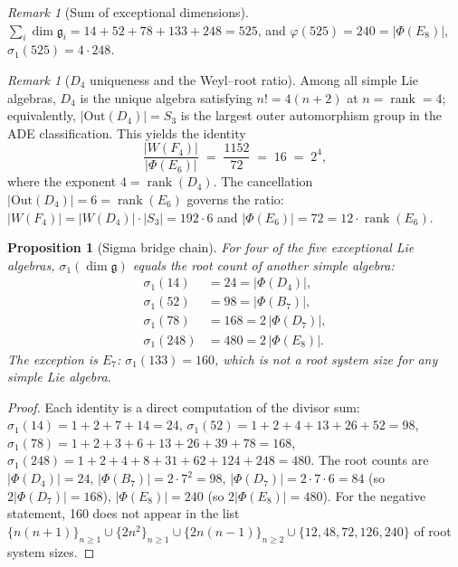 \documentclass[11pt]{amsart}
\theoremstyle{plain}
\newtheorem{proposition}[theorem]{Proposition}
\theoremstyle{definition}
\theoremstyle{remark}
\newtheorem{remark}[theorem]{Remark}
\newcommand{\fg}{\mathfrak{g}}
\renewcommand{\Phi}{\varPhi}
\newcommand{\rank}{\operatorname{rank}}
\begin{document}
\begin{remark}[Sum of exceptional dimensions]\label{rem:sum-dims}
$\sum_{i} \dim \mathfrak{g}_i = 14+52+78+133+248 = 525$, and
$\varphi(525) = 240 = |\Phi(E_8)|$, $\sigma_1(525) = 4 \cdot 248$.
\end{remark}

\begin{remark}[$D_4$ uniqueness and the Weyl--root ratio]%
\label{rem:weyl-root-ratio}
Among all simple Lie algebras, $D_4$ is the unique algebra satisfying
$n! = 4(n+2)$ at $n = \rank = 4$; equivalently,
$|\mathrm{Out}(D_4)| = S_3$ is the largest outer automorphism group
in the ADE classification.  This yields the identity
\[
  \frac{|W(F_4)|}{|\Phi(E_6)|}
  \;=\; \frac{1152}{72} \;=\; 16 \;=\; 2^4,
\]
where the exponent $4 = \rank(D_4)$.  The cancellation
$|\mathrm{Out}(D_4)| = 6 = \rank(E_6)$ governs the ratio:
$|W(F_4)| = |W(D_4)| \cdot |S_3| = 192 \cdot 6$ and
$|\Phi(E_6)| = 72 = 12 \cdot \rank(E_6)$.
\end{remark}

\begin{proposition}[Sigma bridge chain]\label{prop:sigma-chain}
For four of the five exceptional Lie algebras,
$\sigma_1(\dim \fg)$ equals the root count of another simple algebra:
\begin{align*}
  \sigma_1(14) &= 24 = |\Phi(D_4)|, \\
  \sigma_1(52) &= 98 = |\Phi(B_7)|, \\
  \sigma_1(78) &= 168 = 2\,|\Phi(D_7)|, \\
  \sigma_1(248) &= 480 = 2\,|\Phi(E_8)|.
\end{align*}
The exception is $E_7$: $\sigma_1(133) = 160$, which is not a root
system size for any simple Lie algebra.
\end{proposition}

\begin{proof}
Each identity is a direct computation of the divisor sum:
$\sigma_1(14) = 1{+}2{+}7{+}14 = 24$,
$\sigma_1(52) = 1{+}2{+}4{+}13{+}26{+}52 = 98$,
$\sigma_1(78) = 1{+}2{+}3{+}6{+}13{+}26{+}39{+}78 = 168$,
$\sigma_1(248) = 1{+}2{+}4{+}8{+}31{+}62{+}124{+}248 = 480$.
The root counts are $|\Phi(D_4)| = 24$, $|\Phi(B_7)| = 2 \cdot 7^2 = 98$,
$|\Phi(D_7)| = 2 \cdot 7 \cdot 6 = 84$ (so $2|\Phi(D_7)| = 168$),
$|\Phi(E_8)| = 240$ (so $2|\Phi(E_8)| = 480$).
For the negative statement, 160 does not appear in the list
$\{n(n+1)\}_{n \ge 1} \cup \{2n^2\}_{n \ge 1}
\cup \{2n(n-1)\}_{n \ge 2} \cup \{12, 48, 72, 126, 240\}$
of root system sizes.
\end{proof}
\end{document}
